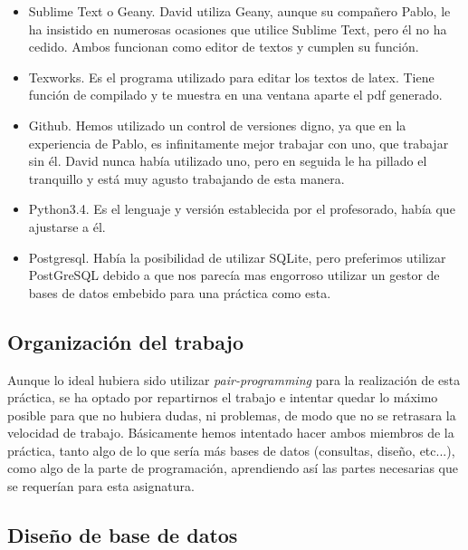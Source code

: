 \documentclass[11pt]{article} %
\begin{document}
\begin{itemize}

\item Sublime Text o Geany. David utiliza Geany, aunque su compa\~nero Pablo, le ha insistido en numerosas ocasiones que utilice Sublime Text, pero \'el no ha cedido. Ambos funcionan como editor de textos y cumplen su funci\'on.

\item Texworks. Es el programa utilizado para editar los textos de latex. Tiene funci\'on de compilado y te muestra en una ventana aparte el pdf generado.

\item Github. Hemos utilizado un control de versiones digno, ya que en la experiencia de Pablo, es infinitamente mejor trabajar con uno, que trabajar sin \'el. David nunca hab\'ia utilizado uno, pero en seguida le ha pillado el tranquillo y est\'a muy agusto trabajando de esta manera.

\item Python3.4. Es el lenguaje y versi\'on establecida por el profesorado, hab\'ia que ajustarse a \'el.

\item Postgresql. Hab\'ia la posibilidad de utilizar SQLite, pero preferimos utilizar PostGreSQL debido a que nos parecía mas engorroso utilizar un gestor de bases de datos embebido para una práctica como esta.

\end{itemize}

\subsection{Organizaci\'on del trabajo}

Aunque lo ideal hubiera sido utilizar \emph{pair-programming} para la realizaci\'on de esta pr\'actica, se ha optado por repartirnos el trabajo e intentar quedar lo m\'aximo posible para que no hubiera dudas, ni problemas, de modo que no se retrasara la velocidad de trabajo. B\'asicamente hemos intentado hacer ambos miembros de la pr\'actica, tanto algo de lo que ser\'ia m\'as bases de datos (consultas, dise\~no, etc...), como algo de la parte de programaci\'on, aprendiendo as\'i las partes necesarias que se requer\'ian para esta asignatura.

\subsection{Dise\~no de base de datos}
\end{document}
